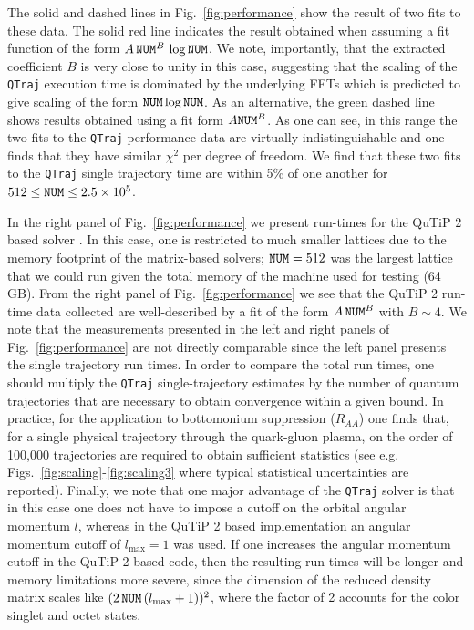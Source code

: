 \documentclass[times,sort&compress,final]{elsarticle}
\def\qtraj{{\tt QTraj} }
\begin{document}
The solid and dashed lines in Fig.~\ref{fig:performance} show the result of two fits to these data.  The solid red line indicates the result obtained when assuming a fit function of the form $A \, {\tt NUM}^B \, \log{\tt NUM}$.  We note, importantly, that the extracted coefficient $B$ is very close to unity in this case, suggesting that the scaling of the \qtraj execution time is dominated by the underlying FFTs which is predicted to give scaling of the form ${\tt NUM} \log{\tt NUM}$.  As an alternative, the green dashed line shows results obtained using a fit form $A {\tt NUM}^B$.  As one can see, in this range the two fits to the \qtraj performance data are virtually indistinguishable and one finds that they have similar $\chi^2$ per degree of freedom.  We find that these two fits to the \qtraj single trajectory time are within 5\% of one another for $512 \leq {\tt NUM} \leq 2.5 \times 10^5$.

In the right panel of Fig.~\ref{fig:performance} we present run-times for the QuTiP 2 based solver \cite{qutip2,Brambilla:2016wgg,Brambilla:2017zei}.  In this case, one is restricted to much smaller lattices due to the memory footprint of the matrix-based solvers; ${\tt NUM} = 512$ was the largest lattice that we could run given the total memory of the machine used for testing (64 GB).  From the right panel of Fig.~\ref{fig:performance} we see that the QuTiP 2 run-time data collected are well-described by a fit of the form $A \, {\tt NUM}^B$ with $B \sim 4$.  
We note that the measurements presented in the left and right panels of Fig.~\ref{fig:performance} are not directly comparable since the left panel presents the single trajectory run times.  In order to compare the total run times, one should multiply the \qtraj single-trajectory estimates by the number of quantum trajectories that are necessary to obtain convergence within a given bound.  In practice, for the application to bottomonium suppression ($R_{AA}$) one finds that, for a single physical trajectory through the quark-gluon plasma, on the order of 100,000 trajectories are required to obtain sufficient statistics (see e.g. Figs.~\ref{fig:scaling}-\ref{fig:scaling3} where typical statistical uncertainties are reported).  Finally, we note that one major advantage of the \qtraj solver is that in this case one does not have to impose a cutoff on the orbital angular momentum $l$, whereas in the QuTiP 2 based implementation an angular momentum cutoff of $l_\text{max}=1$ was used.  If one increases the angular momentum cutoff in the QuTiP 2 based code, then the resulting run times will be longer and memory limitations more severe, since the dimension of the reduced density matrix scales like $(2 \, {\tt NUM} \, (l_\text{max} + 1))^2$, where the factor of 2 accounts for the color singlet and octet states.  
\end{document}
